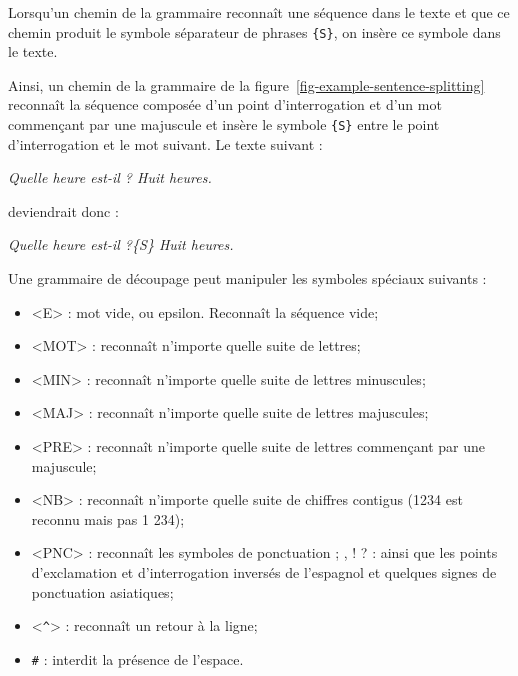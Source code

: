 \bigskip
\noindent  Lorsqu’un chemin de la grammaire reconnaît une séquence dans le texte et que ce chemin
produit le symbole séparateur de phrases \verb+{S}+,
on insère ce symbole dans le texte.

\bigskip
\noindent Ainsi,
un chemin de la grammaire de la figure~\ref{fig-example-sentence-splitting} reconnaît la séquence
composée d’un point d’interrogation et d’un mot commençant par une majuscule et insère le symbole 
\verb+{S}+ entre le point d’interrogation et le mot suivant. Le texte suivant :


\bigskip
\textit{Quelle heure est-il ? Huit heures.}

\bigskip
\noindent deviendrait donc :

\bigskip
\textit{Quelle heure est-il ?\{S\} Huit heures.}

\bigskip
\noindent Une grammaire de découpage peut manipuler les symboles spéciaux suivants :

\index{\verb+<^>+}\index{\verb+#+}
\begin{itemize}
  \item <E> : mot vide, ou epsilon. Reconnaît la séquence vide;
  \item <MOT> : reconnaît n’importe quelle suite de lettres;
  \item <MIN> : reconnaît n’importe quelle suite de lettres minuscules;
  \item <MAJ> : reconnaît n’importe quelle suite de lettres majuscules;
  \item <PRE> : reconnaît n’importe quelle suite de lettres commençant par une majuscule;
  \item <NB> : reconnaît n’importe quelle suite de chiffres contigus (1234 est reconnu mais pas 1 234); 
  \item <PNC> : reconnaît les symboles de ponctuation ; , ! ? : ainsi que les points d’exclamation
  	  et d’interrogation inversés de l’espagnol et quelques signes de ponctuation asiatiques;
  \item <\verb+^+> : reconnaît un retour à la ligne;
  \item \verb+#+ : interdit la présence de l’espace.
\end{itemize}

